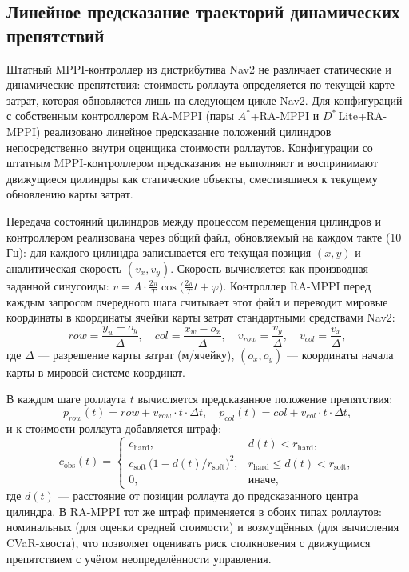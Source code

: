 \documentclass[a4paper,12pt]{extarticle}
\begin{document}
    \subsection{Линейное предсказание траекторий динамических препятствий}

    Штатный MPPI-контроллер из дистрибутива Nav2 не различает статические и динамические препятствия: стоимость роллаута определяется по текущей карте затрат, которая обновляется лишь на следующем цикле Nav2. Для конфигураций с собственным контроллером RA-MPPI (пары $A^*$+RA-MPPI и $D^*$\,Lite+RA-MPPI) реализовано линейное предсказание положений цилиндров непосредственно внутри оценщика стоимости роллаутов. Конфигурации со штатным MPPI-контроллером предсказания не выполняют и воспринимают движущиеся цилиндры как статические объекты, сместившиеся к текущему обновлению карты затрат.

    Передача состояний цилиндров между процессом перемещения цилиндров и контроллером реализована через общий файл, обновляемый на каждом такте (10\,Гц): для каждого цилиндра записывается его текущая позиция $(x, y)$ и аналитическая скорость $(v_x, v_y)$. Скорость вычисляется как производная заданной синусоиды: $v = A \cdot \tfrac{2\pi}{T} \cos\!\bigl(\tfrac{2\pi}{T}t + \varphi\bigr)$. Контроллер RA-MPPI перед каждым запросом очередного шага считывает этот файл и переводит мировые координаты в координаты ячейки карты затрат стандартными средствами Nav2:
    \[
        \mathit{row} = \frac{y_w - o_y}{\Delta},\quad
        \mathit{col} = \frac{x_w - o_x}{\Delta},\quad
        v_{\mathit{row}} = \frac{v_y}{\Delta},\quad
        v_{\mathit{col}} = \frac{v_x}{\Delta},
    \]
    где $\Delta$ --- разрешение карты затрат (м/ячейку), $(o_x, o_y)$ --- координаты начала карты в мировой системе координат.

    В каждом шаге роллаута $t$ вычисляется предсказанное положение препятствия:
    \[
        p_{\mathit{row}}(t) = \mathit{row} + v_{\mathit{row}} \cdot t \cdot \Delta t,\quad
        p_{\mathit{col}}(t) = \mathit{col} + v_{\mathit{col}} \cdot t \cdot \Delta t,
    \]
    и к стоимости роллаута добавляется штраф:
    \[
        c_{\mathrm{obs}}(t) =
        \begin{cases}
            c_{\mathrm{hard}}, & d(t) < r_{\mathrm{hard}},\\
            c_{\mathrm{soft}}\,\bigl(1 - d(t)/r_{\mathrm{soft}}\bigr)^2, & r_{\mathrm{hard}} \le d(t) < r_{\mathrm{soft}},\\
            0, & \text{иначе},
        \end{cases}
    \]
    где $d(t)$ --- расстояние от позиции роллаута до предсказанного центра цилиндра. В RA-MPPI тот же штраф применяется в обоих типах роллаутов: номинальных (для оценки средней стоимости) и возмущённых (для вычисления CVaR-хвоста), что позволяет оценивать риск столкновения с движущимся препятствием с учётом неопределённости управления.
\end{document}
